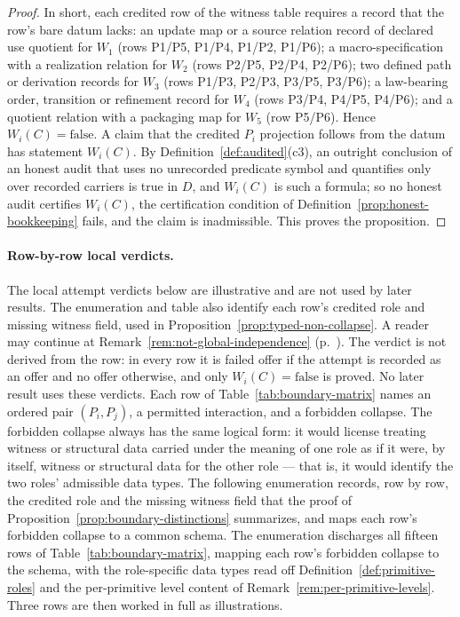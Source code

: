 \documentclass[11pt]{article}
\theoremstyle{definition}
\begin{document}
\begin{proof}
In short, each credited row of the witness table requires a record that the
row's bare datum lacks: an update map or a source relation record of declared use quotient for \(W_1\) (rows P1/P5, P1/P4, P1/P2, P1/P6); a
macro-specification with a realization relation for \(W_2\) (rows P2/P5,
P2/P4, P2/P6); two defined path or derivation records for \(W_3\) (rows
P1/P3, P2/P3, P3/P5, P3/P6); a law-bearing order, transition or refinement
record for \(W_4\) (rows P3/P4, P4/P5, P4/P6); and a quotient relation with a
packaging map for \(W_5\) (row P5/P6). Hence \(W_i(C)=\mathrm{false}\). A claim that the credited \(P_i\) projection
follows from the datum has statement \(W_i(C)\). By
Definition~\ref{def:audited}(c3), an outright conclusion of an honest audit that
uses no unrecorded predicate symbol and quantifies only over recorded carriers
is true in \(D\), and \(W_i(C)\) is such a formula; so no honest audit certifies
\(W_i(C)\), the certification condition of
Definition~\ref{prop:honest-bookkeeping} fails, and the claim is inadmissible.
This proves the proposition.
\end{proof}

\paragraph{Row-by-row local verdicts.} The local attempt verdicts below
are illustrative and are not used by later results. The enumeration and
table also identify each row's credited role and missing witness field,
used in Proposition~\ref{prop:typed-non-collapse}. A reader may continue
at Remark~\ref{rem:not-global-independence}
(p.~\pageref{rem:not-global-independence}). The verdict is not derived
from the row: in every row it is
failed offer if the attempt is recorded as an offer and no offer otherwise,
and only \(W_i(C)=\mathrm{false}\) is proved. No later result uses these
verdicts. Each row of Table~\ref{tab:boundary-matrix} names an
ordered pair \((P_i,P_j)\), a permitted interaction, and a forbidden
collapse. The forbidden collapse always has the same logical form: it would
license treating witness or structural data carried under the meaning of one
role as if it were, by itself, witness or structural data for the other role
--- that is, it would identify the two roles' admissible data types. The following
enumeration records, row by row, the credited role and the missing witness
field that the proof of Proposition~\ref{prop:boundary-distinctions}
summarizes, and maps each row's forbidden collapse to a common schema. The
enumeration discharges
all fifteen rows of Table~\ref{tab:boundary-matrix}, mapping each row's
forbidden collapse to the schema, with the role-specific data types read off
Definition~\ref{def:primitive-roles} and the per-primitive level content of
Remark~\ref{rem:per-primitive-levels}. Three rows are then worked in full as
illustrations.
\end{document}
